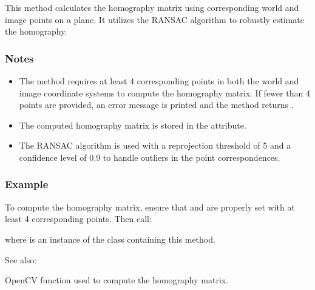 \documentclass[letterpaper,10pt,english]{sphinxmanual}
\begin{document}
\begin{fulllineitems}
\begin{fulllineitems}
\sphinxAtStartPar
This method calculates the homography matrix using corresponding world and image
points on a plane. It utilizes the RANSAC algorithm to robustly estimate the homography.
\subsubsection*{Notes}
\begin{itemize}
\item {} 
\sphinxAtStartPar
The method requires at least 4 corresponding points in both the world and image
coordinate systems to compute the homography matrix. If fewer than 4 points are
provided, an error message is printed and the method returns .

\item {} 
\sphinxAtStartPar
The computed homography matrix  is stored in the  attribute.

\item {} 
\sphinxAtStartPar
The RANSAC algorithm is used with a reprojection threshold of 5 and a confidence
level of 0.9 to handle outliers in the point correspondences.

\end{itemize}
\subsubsection*{Example}

\sphinxAtStartPar
To compute the homography matrix, ensure that  and
 are properly set with at least 4 corresponding points.
Then call:

\begin{sphinxVerbatim}[commandchars=\\\{\}]
\end{sphinxVerbatim}

\sphinxAtStartPar
where  is an instance of the class containing this method.


\begin{sphinxseealso}{See also:}
\begin{description}
\sphinxAtStartPar
OpenCV function used to compute the homography matrix.

\end{description}



\end{sphinxseealso}
\end{fulllineitems}
\end{fulllineitems}
\end{document}
